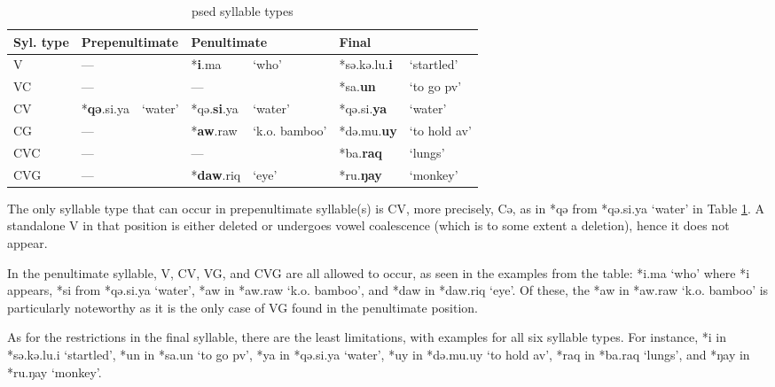 \begin{table}[!htbp]
\centering
\caption{\acl{psed} syllable types}
\label{tab:psed_syl_type}
\begin{tabular}{lllllll}
\hline
Syl. type     & \multicolumn{2}{l}{Prepenultimate} & \multicolumn{2}{l}{Penultimate} & \multicolumn{2}{l}{Final}        \\ \hline
V             & ---               &                & *\textbf{i}.ma        & `who'            & *sə.kə.lu.\textbf{i} & `startled'         \\
VC            & ---               &                & ---          &                  & *sa.\textbf{un}      & `to go \acs{pv}'   \\
CV            & *\textbf{qə}.si.ya         & `water'        & *qə.\textbf{si}.ya    & `water'          & *qə.si.\textbf{ya}   & `water'            \\
CG            & ---               &                & *\textbf{aw}.raw      & `k.o. bamboo'    & *də.mu.\textbf{uy}   & `to hold \acs{av}' \\
CVC           & ---               &                & ---          &                  & *ba.\textbf{raq}     & `lungs'            \\
CVG           & ---               &                & *\textbf{daw}.riq     & `eye'            & *ru.\textbf{ŋay}     & `monkey'           \\ \hline
\end{tabular}
\end{table}

The only syllable type that can occur in prepenultimate syllable(s) is CV, more precisely, Cə, as in *qə from *qə.si.ya `water' in Table \ref{tab:psed_syl_type}. A standalone V in that position is either deleted or undergoes vowel coalescence (which is to some extent a deletion), hence it does not appear. 

In the penultimate syllable, V, CV, VG, and CVG are all allowed to occur, as seen in the examples from the table: *i.ma `who' where *i appears, *si from *qə.si.ya `water', *aw in *aw.raw `k.o. bamboo', and *daw in *daw.riq `eye'. Of these, the *aw in *aw.raw `k.o. bamboo' is particularly noteworthy as it is the only case of VG found in the penultimate position.

As for the restrictions in the final syllable, there are the least limitations, with examples for all six syllable types. For instance, *i in *sə.kə.lu.i `startled', *un in *sa.un `to go \acs{pv}', *ya in *qə.si.ya `water', *uy in *də.mu.uy `to hold \acs{av}', *raq in *ba.raq `lungs', and *ŋay in *ru.ŋay `monkey'. 

